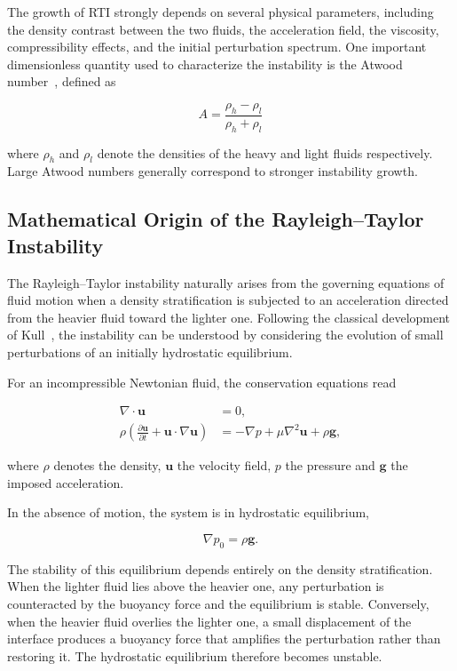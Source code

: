 The growth of RTI strongly depends on several physical parameters, including the density contrast between the two fluids, the acceleration field, the viscosity, compressibility effects, and the initial perturbation spectrum. One important dimensionless quantity used to characterize the instability is the Atwood number~\citep[p.~22]{zhou2017rti1}, defined as

\begin{equation}
    A = \frac{\rho_h - \rho_l}{\rho_h + \rho_l}
\end{equation}

where $\rho_h$ and $\rho_l$ denote the densities of the heavy and light fluids respectively. Large Atwood numbers generally correspond to stronger instability growth.


\subsection{Mathematical Origin of the Rayleigh--Taylor Instability}

The Rayleigh--Taylor instability naturally arises from the governing equations of fluid motion when a density stratification is subjected to an acceleration directed from the heavier fluid toward the lighter one. Following the classical development of Kull~\cite{KULL1991197}, the instability can be understood by considering the evolution of small perturbations of an initially hydrostatic equilibrium.

For an incompressible Newtonian fluid, the conservation equations read

\begin{align}
\nabla\cdot\mathbf{u} &= 0,\\
\rho\left(
\frac{\partial\mathbf{u}}{\partial t}
+\mathbf{u}\cdot\nabla\mathbf{u}
\right)
&=
-\nabla p
+\mu\nabla^2\mathbf{u}
+\rho\mathbf{g},
\end{align}

where $\rho$ denotes the density, $\mathbf{u}$ the velocity field, $p$ the pressure and $\mathbf{g}$ the imposed acceleration.

In the absence of motion, the system is in hydrostatic equilibrium,

\begin{equation}
\nabla p_0=\rho\mathbf{g}.
\end{equation}

The stability of this equilibrium depends entirely on the density stratification. When the lighter fluid lies above the heavier one, any perturbation is counteracted by the buoyancy force and the equilibrium is stable. Conversely, when the heavier fluid overlies the lighter one, a small displacement of the interface produces a buoyancy force that amplifies the perturbation rather than restoring it. The hydrostatic equilibrium therefore becomes unstable.

